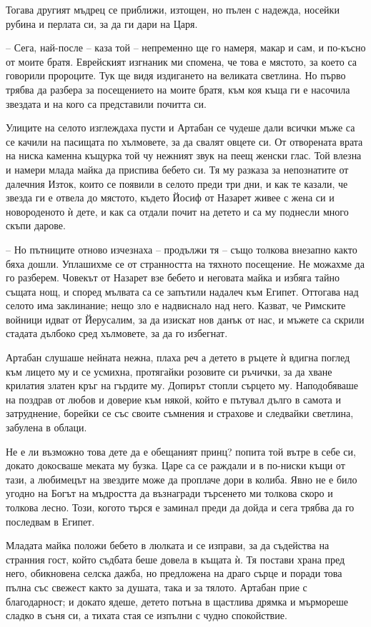 Тогава другият мъдрец се приближи, изтощен, но пълен с надежда, носейки рубина и
перлата си, за да ги дари на Царя.

-- Сега, най-после -- каза той -- непременно ще го намеря, макар и сам, и
по-късно от моите братя. Еврейският изгнаник ми спомена, че това е мястото, за
което са говорили пророците. Тук ще видя издигането на великата светлина. Но
първо трябва да разбера за посещението на моите братя, към коя къща ги е
насочила звездата и на кого са представили почитта си.

Улиците на селото изглеждаха пусти и Артабан се чудеше дали всички мъже са се
качили на пасищата по хълмовете, за да свалят овцете си. От отворената врата на
ниска каменна къщурка той чу нежният звук на пеещ женски глас. Той влезна и
намери млада майка да приспива бебето си. Тя му разказа за непознатите от
далечния Изток, които се появили в селото преди три дни, и как те казали, че
звезда ги е отвела до мястото, където Йосиф от Назарет живее с жена си и
новороденото ѝ дете, и как са отдали почит на детето и са му поднесли много
скъпи дарове.

-- Но пътниците отново изчезнаха -- продължи тя -- също толкова внезапно както
бяха дошли. Уплашихме се от странността на тяхното посещение. Не можахме да го
разберем. Човекът от Назарет взе бебето и неговата майка и избяга тайно същата
нощ, и според мълвата са се запътили надалеч към Египет. Оттогава над селото има
заклинание; нещо зло е надвиснало над него. Казват, че Римските войници идват от
Йерусалим, за да изискат нов данък от нас, и мъжете са скрили стадата дълбоко
сред хълмовете, за да го избегнат.

Артабан слушаше нейната нежна, плаха реч а детето в ръцете ѝ вдигна поглед към
лицето му и се усмихна, протягайки розовите си ръчички, за да хване крилатия
златен кръг на гърдите му. Допирът стопли сърцето му. Наподобяваше на поздрав от
любов и доверие към някой, който е пътувал дълго в самота и затруднение, борейки
се със своите съмнения и страхове и следвайки светлина, забулена в облаци.

Не е ли възможно това дете да е обещаният принц? попита той вътре в себе си,
докато докосваше меката му бузка. Царе са се раждали и в по-ниски къщи от тази,
а любимецът на звездите може да проплаче дори в колиба. Явно не е било угодно на
Богът на мъдростта да възнагради търсенето ми толкова скоро и толкова лесно.
Този, когото търся е заминал преди да дойда и сега трябва да го последвам в
Египет.

Младата майка положи бебето в люлката и се изправи, за да съдейства на странния
гост, който съдбата беше довела в къщата ѝ. Тя постави храна пред него,
обикновена селска дажба, но предложена на драго сърце и поради това пълна със
свежест както за душата, така и за тялото. Артабан прие с благодарност; и докато
ядеше, детето потъна в щастлива дрямка и мърмореше сладко в съня си, а тихата
стая се изпълни с чудно спокойствие.

